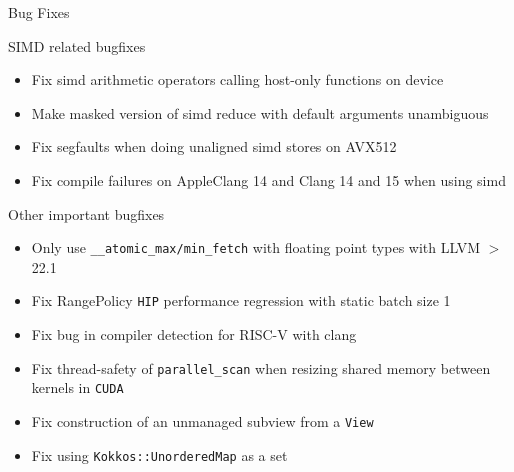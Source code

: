 
\begin{frame}[fragile]

  {\Huge Bug Fixes}

  \vspace{10pt}

\end{frame}




\begin{frame}[fragile]{SIMD related bugfixes}
 \begin{itemize}
     \item Fix simd arithmetic operators calling host-only functions on device
     \item Make masked version of simd reduce with default arguments unambiguous
     \item Fix segfaults when doing unaligned simd stores on AVX512
     \item Fix compile failures on AppleClang 14 and Clang 14 and 15 when using simd
 \end{itemize}
\end{frame}

\begin{frame}[fragile]{Other important bugfixes}
 \begin{itemize}
   \item Only use \texttt{\_\_atomic\_max/min\_fetch} with floating point types with LLVM $>$22.1
   \item Fix RangePolicy \texttt{HIP} performance regression with static batch size 1
   \item Fix bug in compiler detection for RISC-V with clang
   \item Fix thread-safety of \texttt{parallel\_scan} when resizing shared memory between kernels in \texttt{CUDA}
   \item Fix construction of an unmanaged subview from a \texttt{View}
   \item Fix using \texttt{Kokkos::UnorderedMap} as a set
 \end{itemize}
\end{frame}

